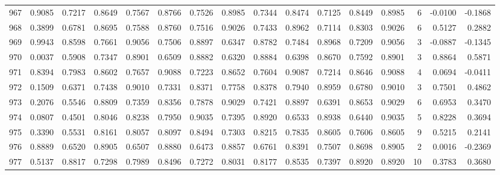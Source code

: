 \begin{tabular}{lrrrrrrrrrrrrrrr}
967 &      0.9085 &  0.7217 &  0.8649 &  0.7567 &  0.8766 &  0.7526 &  0.8985 &  0.7344 &  0.8474 &  0.7125 &   0.8449 &     0.8985 &      6 &                   -0.0100 &                    -0.1868 \\
968 &      0.3899 &  0.6781 &  0.8695 &  0.7588 &  0.8760 &  0.7516 &  0.9026 &  0.7433 &  0.8962 &  0.7114 &   0.8303 &     0.9026 &      6 &                    0.5127 &                     0.2882 \\
969 &      0.9943 &  0.8598 &  0.7661 &  0.9056 &  0.7506 &  0.8897 &  0.6347 &  0.8782 &  0.7484 &  0.8968 &   0.7209 &     0.9056 &      3 &                   -0.0887 &                    -0.1345 \\
970 &      0.0037 &  0.5908 &  0.7347 &  0.8901 &  0.6509 &  0.8882 &  0.6320 &  0.8884 &  0.6398 &  0.8670 &   0.7592 &     0.8901 &      3 &                    0.8864 &                     0.5871 \\
971 &      0.8394 &  0.7983 &  0.8602 &  0.7657 &  0.9088 &  0.7223 &  0.8652 &  0.7604 &  0.9087 &  0.7214 &   0.8646 &     0.9088 &      4 &                    0.0694 &                    -0.0411 \\
972 &      0.1509 &  0.6371 &  0.7438 &  0.9010 &  0.7331 &  0.8371 &  0.7758 &  0.8378 &  0.7940 &  0.8959 &   0.6780 &     0.9010 &      3 &                    0.7501 &                     0.4862 \\
973 &      0.2076 &  0.5546 &  0.8809 &  0.7359 &  0.8356 &  0.7878 &  0.9029 &  0.7421 &  0.8897 &  0.6391 &   0.8653 &     0.9029 &      6 &                    0.6953 &                     0.3470 \\
974 &      0.0807 &  0.4501 &  0.8046 &  0.8238 &  0.7950 &  0.9035 &  0.7395 &  0.8920 &  0.6533 &  0.8938 &   0.6440 &     0.9035 &      5 &                    0.8228 &                     0.3694 \\
975 &      0.3390 &  0.5531 &  0.8161 &  0.8057 &  0.8097 &  0.8494 &  0.7303 &  0.8215 &  0.7835 &  0.8605 &   0.7606 &     0.8605 &      9 &                    0.5215 &                     0.2141 \\
976 &      0.8889 &  0.6520 &  0.8905 &  0.6507 &  0.8880 &  0.6473 &  0.8857 &  0.6761 &  0.8391 &  0.7507 &   0.8698 &     0.8905 &      2 &                    0.0016 &                    -0.2369 \\
977 &      0.5137 &  0.8817 &  0.7298 &  0.7989 &  0.8496 &  0.7272 &  0.8031 &  0.8177 &  0.8535 &  0.7397 &   0.8920 &     0.8920 &     10 &                    0.3783 &                     0.3680 \\

\end{tabular}
